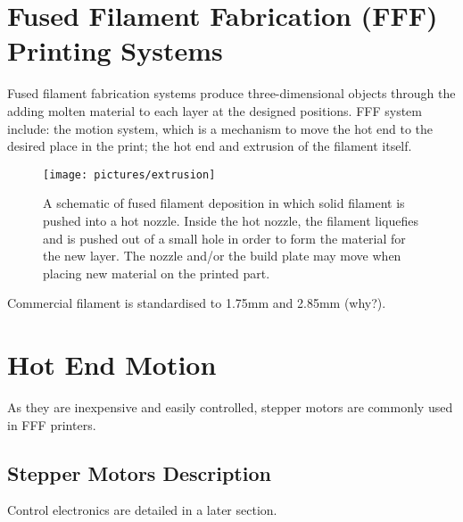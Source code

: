 % 
% 
% 
% 
% 
% 
% 

\section{Fused Filament Fabrication (FFF) Printing Systems}

Fused filament fabrication systems produce three-dimensional objects through the adding molten material to each layer at the designed positions. FFF system include: the motion system, which is a mechanism to move the hot end to the desired place in the print; the hot end and extrusion of the filament itself. 

\begin{figure}
\centering
\texttt{[image: pictures/extrusion]}
\caption{A schematic of fused filament deposition in which solid filament is pushed into a hot nozzle. Inside the hot nozzle, the filament liquefies and is pushed out of a small hole in order to form the material for the new layer. The nozzle and/or the build plate may move when placing new material on the printed part.}
\label{fig:extrusion}
\end{figure}

Commercial filament is standardised to 1.75mm and 2.85mm (why?). 

\section{Hot End Motion}

As they are inexpensive and easily controlled, stepper motors are commonly used in FFF printers. 

\subsection{Stepper Motors Description}

Control electronics are detailed in a later section. 

